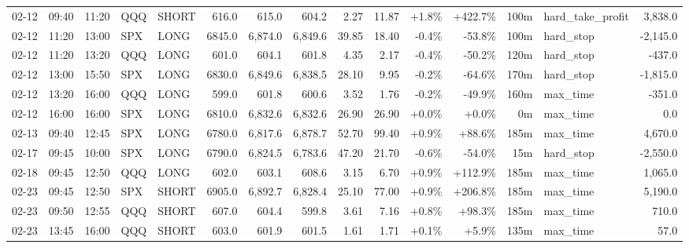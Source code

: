 \documentclass[11pt,a4paper,twoside]{article}
\begin{document}
\begin{landscape}
\begin{center}
\begin{longtable}{>{\color{txtmain}}l l l l l r r r r r r r r >{\color{txtmain}}l r}
02-12 & 09:40 & 11:20 & QQQ & SHORT & 616.0 & 615.0 & 604.2 & 2.27 & 11.87 & \textcolor{wingreen}{+1.8\%} & \textcolor{wingreen}{+422.7\%} & 100m & hard\_take\_profit & \textcolor{wingreen}{3,838.0} \\
02-12 & 11:20 & 13:00 & SPX & LONG & 6845.0 & 6,874.0 & 6,849.6 & 39.85 & 18.40 & \textcolor{lossred}{-0.4\%} & \textcolor{lossred}{-53.8\%} & 100m & hard\_stop & \textcolor{lossred}{-2,145.0} \\
02-12 & 11:20 & 13:20 & QQQ & LONG & 601.0 & 604.1 & 601.8 & 4.35 & 2.17 & \textcolor{lossred}{-0.4\%} & \textcolor{lossred}{-50.2\%} & 120m & hard\_stop & \textcolor{lossred}{-437.0} \\
02-12 & 13:00 & 15:50 & SPX & LONG & 6830.0 & 6,849.6 & 6,838.5 & 28.10 & 9.95 & \textcolor{lossred}{-0.2\%} & \textcolor{lossred}{-64.6\%} & 170m & hard\_stop & \textcolor{lossred}{-1,815.0} \\
02-12 & 13:20 & 16:00 & QQQ & LONG & 599.0 & 601.8 & 600.6 & 3.52 & 1.76 & \textcolor{lossred}{-0.2\%} & \textcolor{lossred}{-49.9\%} & 160m & max\_time & \textcolor{lossred}{-351.0} \\
02-12 & 16:00 & 16:00 & SPX & LONG & 6810.0 & 6,832.6 & 6,832.6 & 26.90 & 26.90 & \textcolor{wingreen}{+0.0\%} & \textcolor{wingreen}{+0.0\%} & 0m & max\_time & \textcolor{wingreen}{0.0} \\
02-13 & 09:40 & 12:45 & SPX & LONG & 6780.0 & 6,817.6 & 6,878.7 & 52.70 & 99.40 & \textcolor{wingreen}{+0.9\%} & \textcolor{wingreen}{+88.6\%} & 185m & max\_time & \textcolor{wingreen}{4,670.0} \\
02-17 & 09:45 & 10:00 & SPX & LONG & 6790.0 & 6,824.5 & 6,783.6 & 47.20 & 21.70 & \textcolor{lossred}{-0.6\%} & \textcolor{lossred}{-54.0\%} & 15m & hard\_stop & \textcolor{lossred}{-2,550.0} \\
02-18 & 09:45 & 12:50 & QQQ & LONG & 602.0 & 603.1 & 608.6 & 3.15 & 6.70 & \textcolor{wingreen}{+0.9\%} & \textcolor{wingreen}{+112.9\%} & 185m & max\_time & \textcolor{wingreen}{1,065.0} \\
02-23 & 09:45 & 12:50 & SPX & SHORT & 6905.0 & 6,892.7 & 6,828.4 & 25.10 & 77.00 & \textcolor{wingreen}{+0.9\%} & \textcolor{wingreen}{+206.8\%} & 185m & max\_time & \textcolor{wingreen}{5,190.0} \\
02-23 & 09:50 & 12:55 & QQQ & SHORT & 607.0 & 604.4 & 599.8 & 3.61 & 7.16 & \textcolor{wingreen}{+0.8\%} & \textcolor{wingreen}{+98.3\%} & 185m & max\_time & \textcolor{wingreen}{710.0} \\
02-23 & 13:45 & 16:00 & QQQ & SHORT & 603.0 & 601.9 & 601.5 & 1.61 & 1.71 & \textcolor{wingreen}{+0.1\%} & \textcolor{wingreen}{+5.9\%} & 135m & max\_time & \textcolor{wingreen}{57.0} \\

\end{longtable}
\end{center}
\end{landscape}
\end{document}
